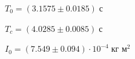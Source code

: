 \noindent $T_0=(3.1575\pm0.0185)\;\text{с}$\par\vspace{3mm}
\noindent $T_c=(4.0285\pm0.0085)\;\text{с}$\par\vspace{3mm}
\noindent $I_0=(7.549\pm0.094)\cdot10^{-4}\;\text{кг м}^2$\par\vspace{3mm}
